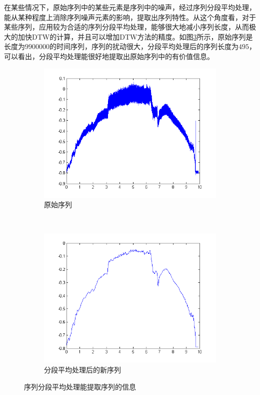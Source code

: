 在某些情况下，原始序列中的某些元素是序列中的噪声，经过序列分段平均处理，能从某种程度上消除序列噪声元素的影响，提取出序列特性。从这个角度看，对于某些序列，应用较为合适的序列分段平均处理，能够很大地减小序列长度，从而极大的加快DTW的计算，并且可以增加DTW方法的精度。如图\ref{fig:add}所示，原始序列是长度为$9900000$的时间序列，序列的扰动很大，分段平均处理后的序列长度为$495$，可以看出，分段平均处理能很好地提取出原始序列中的有价值信息。
\begin{figure}[h]
    \centering
    \begin{subfigure}[b]{0.45\textwidth}
        \includegraphics[width=\textwidth]{./figure/495.PNG}
        \caption{原始序列}
        \label{fig:subfig:original}
    \end{subfigure}
    ~ %
    \begin{subfigure}[b]{0.45\textwidth}
        \includegraphics[width=\textwidth]{./figure/20000.PNG}
        \caption{分段平均处理后的新序列}
        \label{fig:subfig:new}
    \end{subfigure}
    \caption{序列分段平均处理能提取序列的信息}\label{fig:add}
\end{figure}

